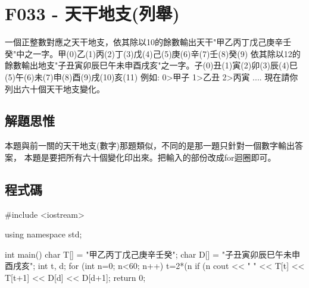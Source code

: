 \section{F033 - 天干地支(列舉)}
一個正整數對應之天干地支，依其除以10的餘數輸出天干"甲乙丙丁戊己庚辛壬癸"中之一字。甲(0)乙(1)丙(2)丁(3)戊(4)己(5)庚(6)辛(7)壬(8)癸(9) 依其除以12的餘數輸出地支"子丑寅卯辰巳午未申酉戌亥"之一字。子(0)丑(1)寅(2)卯(3)辰(4)巳(5)午(6)未(7)申(8)酉(9)戌(10)亥(11) 例如: 0>甲子 1>乙丑 2>丙寅 .... 現在請你列出六十個天干地支變化。
\subsection{解題思惟}
本題與前一關的天干地支(數字)那題類似，不同的是那一題只針對一個數字輸出答案，
本題是要把所有六十個變化印出來。把輸入的部份改成for迴圈即可。
\subsection{程式碼}
\begin{cppcode}
#include <iostream>

using namespace std;

int main()
{
	char T[] = "甲乙丙丁戊己庚辛壬癸";
	char D[] = "子丑寅卯辰巳午未申酉戌亥";
	int t, d;
	for (int n=0; n<60; n++) {
		t=2*(n%
		if (n%
		cout << " " << T[t] << T[t+1] << D[d] << D[d+1];
	}
	return 0;
}
\end{cppcode}
